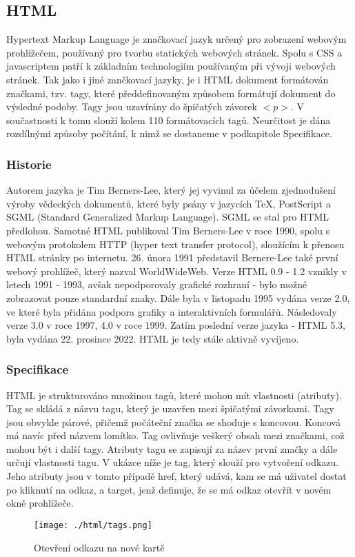 \documentclass[main.tex]{subfiles}
\begin{document}
\subsection{HTML}
\label{html}
Hypertext Markup Language je značkovací jazyk určený pro zobrazení webovým prohlížečem, používaný pro tvorbu statických webových stránek. Spolu s CSS a javascriptem patří k základním technologiím používaným při vývoji webových stránek. Tak jako i jiné zančkovací jazyky, je i HTML dokument formátován značkami, tzv. tagy, které předdefinovaným způsobem formátují dokument do výsledné podoby. Tagy jsou uzavírány do špičatých závorek $<p>$. \cite{web:wik:en:html} V součastnosti k tomu slouží kolem 110 formátovacích tagů. Neurčitost je dána rozdílnými způsoby počítání, k nimž se dostaneme v podkapitole Specifikace. \cite{web:en:countinghtml}


\subsubsection{Historie}
Autorem jazyka je Tim Berners-Lee, který jej vyvinul za účelem zjednodušení výroby vědeckých dokumentů, které byly psány v jazycích TeX, PostScript a SGML (Standard Generalized Markup Language). SGML se stal pro HTML předlohou. Samotné HTML publikoval Tim Berners-Lee v roce 1990, spolu s webovým protokolem HTTP (hyper text transfer protocol), sloužícím k přenosu HTML stránky po internetu. 26. února 1991 představil Bernere-Lee také první webový prohlížeč, který nazval WorldWideWeb.
Verze HTML 0.9 - 1.2 vznikly v letech 1991 - 1993, avšak nepodporovaly grafické rozhraní - bylo možné zobrazovat pouze standardní znaky. Dále byla v listopadu 1995 vydána verze 2.0, ve které byla přidána podpora grafiky a interaktivních formulářů. Následovaly verze 3.0 v roce 1997, 4.0 v roce 1999. Zatím poslední verze jazyka - HTML 5.3, byla vydána 22. prosince 2022. HTML je tedy stále aktivně vyvíjeno. \cite{web:wik:en:html}


\subsubsection{Specifikace}
HTML je strukturováno množinou tagů, které mohou mít vlastnosti (atributy). Tag se skládá z názvu tagu, který je uzavřen mezi špičatými závorkami. Tagy jsou obvykle párové, přičemž počáteční značka se shoduje s koncovou. Koncová má navíc před názvem lomítko. Tag ovlivňuje veškerý obsah mezi značkami, což mohou být i další tagy. Atributy tagu se zapisují za název první značky a dále určují vlastnosti tagu. V ukázce níže je tag, který slouží pro vytvoření odkazu. Jeho atributy jsou v tomto případě href, který udává, kam se má uživatel dostat po kliknutí na odkaz, a target, jenž definuje, že se má odkaz otevřít v novém okně prohlížeče.\cite{web:wik:en:html}
		\begin{figure}[h]
			\centering
			\texttt{[image: ./html/tags.png]}
			\caption{Otevření odkazu na nové kartě}
		\end{figure}
\end{document}
